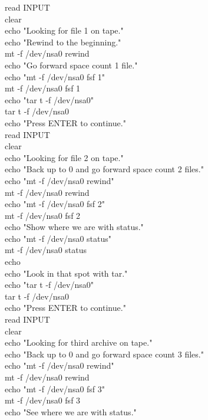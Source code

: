 {read INPUT\\
clear\\
echo "Looking for file 1 on tape."\\
echo "Rewind to the beginning."\\
mt -f /dev/nsa0 rewind\\
echo "Go forward space count 1 file."\\
echo "mt -f /dev/nsa0 fsf 1"\\
mt -f /dev/nsa0 fsf 1\\
echo "tar t -f /dev/nsa0"\\
tar t -f /dev/nsa0\\
echo "Press ENTER to continue."\\
read INPUT\\
clear\\
echo "Looking for file 2 on tape."\\
echo "Back up to 0 and go forward space count 2 files."\\
echo "mt -f /dev/nsa0 rewind"\\
mt -f /dev/nsa0 rewind\\
echo "mt -f /dev/nsa0 fsf 2"\\
mt -f /dev/nsa0 fsf 2\\
echo "Show where we are with status."\\
echo "mt -f /dev/nsa0 status"\\
mt -f /dev/nsa0 status\\
echo\\
echo "Look in that spot with tar."\\
echo "tar t -f /dev/nsa0"\\
tar t -f /dev/nsa0\\
echo "Press ENTER to continue."\\
read INPUT\\
clear\\
echo "Looking for third archive on tape."\\
echo "Back up to 0 and go forward space count 3 files."\\
echo "mt -f /dev/nsa0 rewind"\\
mt -f /dev/nsa0 rewind\\
echo "mt -f /dev/nsa0 fsf 3"\\
mt -f /dev/nsa0 fsf 3\\
echo "See where we are with status."\\
}
